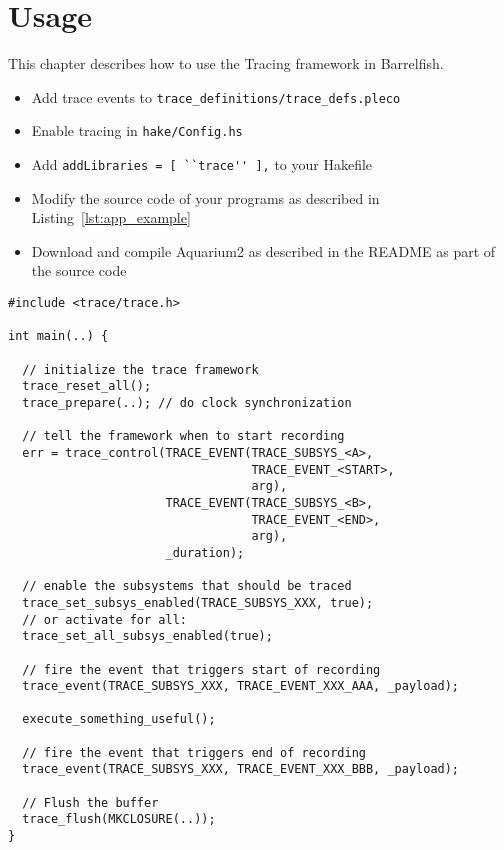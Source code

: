 \documentclass[a4paper,11pt,twoside]{report}
\begin{document}
\chapter{Usage}

This chapter describes how to use the Tracing framework in Barrelfish.

\begin{itemize}
\item Add trace events to \lstinline{trace_definitions/trace_defs.pleco}
\item Enable tracing in \lstinline{hake/Config.hs}
\item Add \lstinline{addLibraries = [ ``trace'' ],} to your Hakefile
\item Modify the source code of your programs as described in
  Listing~\ref{lst:app_example}
\item Download and compile Aquarium2 as described in the README as
  part of the source code
\end{itemize}
\clearpage
\begin{code}
\begin{lstlisting}[frame=single, caption={Enable tracing for an application}, label={lst:app_example}]
#include <trace/trace.h>

int main(..) {

  // initialize the trace framework
  trace_reset_all();
  trace_prepare(..); // do clock synchronization

  // tell the framework when to start recording
  err = trace_control(TRACE_EVENT(TRACE_SUBSYS_<A>,
                                  TRACE_EVENT_<START>,
                                  arg),
                      TRACE_EVENT(TRACE_SUBSYS_<B>,
                                  TRACE_EVENT_<END>,
                                  arg),
                      _duration);

  // enable the subsystems that should be traced
  trace_set_subsys_enabled(TRACE_SUBSYS_XXX, true);
  // or activate for all:
  trace_set_all_subsys_enabled(true);

  // fire the event that triggers start of recording
  trace_event(TRACE_SUBSYS_XXX, TRACE_EVENT_XXX_AAA, _payload);

  execute_something_useful();

  // fire the event that triggers end of recording
  trace_event(TRACE_SUBSYS_XXX, TRACE_EVENT_XXX_BBB, _payload);

  // Flush the buffer
  trace_flush(MKCLOSURE(..));
}
\end{lstlisting}
\end{code}
\end{document}
